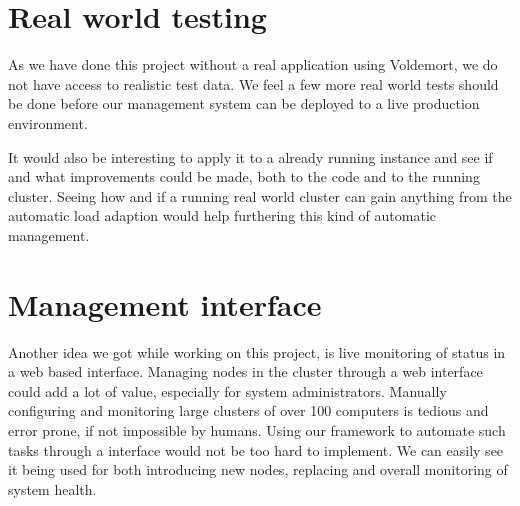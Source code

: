 \section{Real world testing}
As we have done this project without a real application using Voldemort, we do not have access to realistic test data. We feel a few more real world tests should be done before our management system can be deployed to a live production environment.

It would also be interesting to apply it to a already running instance and see if and what improvements could be made, both to the code and to the running cluster.
Seeing how and if a running real world cluster can gain anything from the automatic load adaption would help furthering this kind of automatic management.

\section{Management interface}
Another idea we got while working on this project, is live monitoring of status in a web based interface.
Managing nodes in the cluster through a web interface could add a lot of value, especially for system administrators.
Manually configuring and monitoring large clusters of over 100 computers is tedious and error prone, if not impossible by humans.
Using our framework to automate such tasks through a interface would not be too hard to implement.
We can easily see it being used for both introducing new nodes, replacing and overall monitoring of system health.
